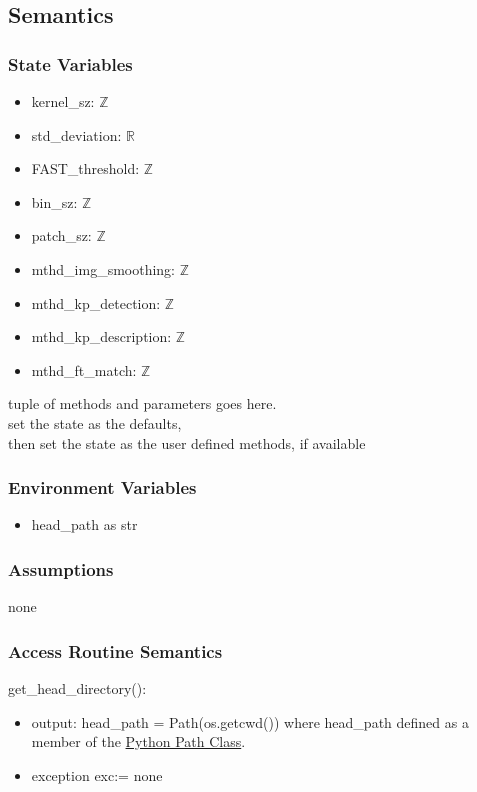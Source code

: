 \documentclass[12pt, titlepage]{article}
\begin{document}
\subsection{Semantics}

\subsubsection{State Variables}
\begin{itemize}
  \item kernel\_sz: $\mathbb{Z}$
  \item std\_deviation: $\mathbb{R}$
  \item FAST\_threshold: $\mathbb{Z}$
  \item bin\_sz: $\mathbb{Z}$
  \item patch\_sz: $\mathbb{Z}$
  \item mthd\_img\_smoothing: $\mathbb{Z}$
  \item mthd\_kp\_detection: $\mathbb{Z}$
  \item mthd\_kp\_description: $\mathbb{Z}$
  \item mthd\_ft\_match: $\mathbb{Z}$
\end{itemize}

tuple of methods and parameters goes here.\\
set the state as the defaults, \\
then set the state as the user defined methods, if available


\subsubsection{Environment Variables}
\begin{itemize}
  \item head\_path as str
\end{itemize}

\subsubsection{Assumptions}
none 

\subsubsection{Access Routine Semantics}
\noindent get\_head\_directory():
\begin{itemize}
  \item output: head\_path = Path(os.getcwd()) where head\_path defined as 
  a member of the \href{https://docs.python.org/3/library/os.path.html}{Python Path Class}.
  \item exception exc:= none
\end{itemize}
\end{document}
